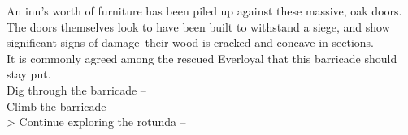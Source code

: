 An inn’s worth of furniture has been piled up against these massive, oak doors. The doors themselves look to have been built to withstand a siege, and show significant signs of damage--their wood is cracked and concave in sections.\\

It is commonly agreed among the rescued Everloyal that this barricade should stay put.\\

 Dig through the barricade -- \\
 Climb the barricade -- \\
> Continue exploring the rotunda -- 